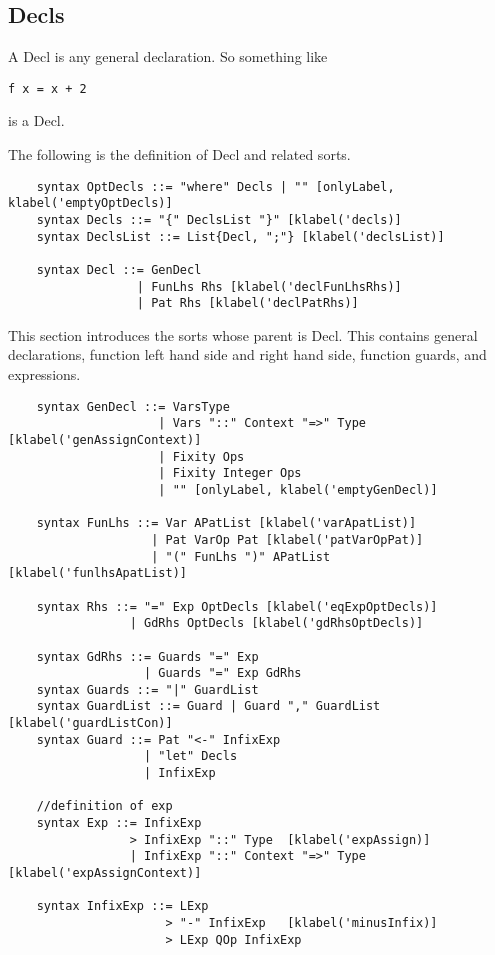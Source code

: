 \subsection{Decls}

A Decl is any general declaration. So something like

\begin{lstlisting}
f x = x + 2
\end{lstlisting}

is a Decl.

The following is the definition of Decl and related sorts.

\begin{lstlisting}
    syntax OptDecls ::= "where" Decls | "" [onlyLabel, klabel('emptyOptDecls)]
    syntax Decls ::= "{" DeclsList "}" [klabel('decls)]
    syntax DeclsList ::= List{Decl, ";"} [klabel('declsList)]

    syntax Decl ::= GenDecl
                  | FunLhs Rhs [klabel('declFunLhsRhs)]
                  | Pat Rhs [klabel('declPatRhs)]
\end{lstlisting}

This section introduces the sorts whose parent is Decl. This contains general declarations, function left hand side and right hand side, function guards, and expressions.

\begin{lstlisting}
    syntax GenDecl ::= VarsType
                     | Vars "::" Context "=>" Type   [klabel('genAssignContext)]
                     | Fixity Ops
                     | Fixity Integer Ops
                     | "" [onlyLabel, klabel('emptyGenDecl)]

    syntax FunLhs ::= Var APatList [klabel('varApatList)]
                    | Pat VarOp Pat [klabel('patVarOpPat)]
                    | "(" FunLhs ")" APatList [klabel('funlhsApatList)]

    syntax Rhs ::= "=" Exp OptDecls [klabel('eqExpOptDecls)]
                 | GdRhs OptDecls [klabel('gdRhsOptDecls)]

    syntax GdRhs ::= Guards "=" Exp
                   | Guards "=" Exp GdRhs
    syntax Guards ::= "|" GuardList
    syntax GuardList ::= Guard | Guard "," GuardList  [klabel('guardListCon)]
    syntax Guard ::= Pat "<-" InfixExp
                   | "let" Decls
                   | InfixExp

    //definition of exp
    syntax Exp ::= InfixExp
                 > InfixExp "::" Type  [klabel('expAssign)]
                 | InfixExp "::" Context "=>" Type  [klabel('expAssignContext)]

    syntax InfixExp ::= LExp
                      > "-" InfixExp   [klabel('minusInfix)]
                      > LExp QOp InfixExp
\end{lstlisting}

